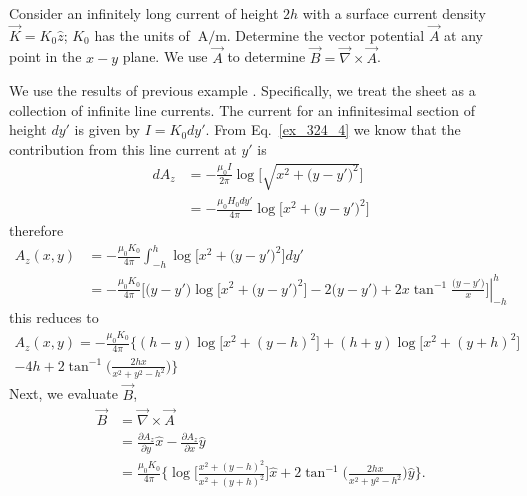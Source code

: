 \documentclass[12pt,a4paper,oneside]{book}
\begin{document}
\begin{onehalfspace}
\begin{example}
Consider an infinitely long current of height $2h$ with a surface current density $\vec{K}=K_0\hat{z}$; $K_0$ has the units of $\SI{}{\ampere\per\meter}$. Determine the vector potential $\vec{A}$ at any point in the $x-y$ plane. We use $\vec{A}$ to determine $\vec{B}=\vec{\nabla}\times\vec{A}$.

We use the results of previous example . Specifically, we treat the sheet as a collection  of infinite line currents. The current for an infinitesimal section of height $dy'$ is given by $I=K_0dy'$. From Eq.~\eqref{ex_324_4} we know that the contribution from this line current at $y'$ is
 \begin{equation}\label{ex_325_1}
	\begin{aligned}
		dA_z&=-\frac{\mu_0 I}{2\pi}\log\Big[\sqrt{x^2+\big(y-y'\big)^2}\Big] \\[6pt]
		&= -\frac{\mu_0 H_0 dy'}{4\pi}\log\Big[x^2+\big(y-y'\big)^2\Big]
	\end{aligned}
\end{equation}
therefore 
 \begin{equation}\label{ex_325_2}
	\begin{aligned}
		A_z(x,y)&=-\frac{\mu_0 K_0}{4\pi} \int_{-h}^{h}\log\Big[x^2+\big(y-y'\big)^2\Big]dy'\\[6pt]
		&= -\frac{\mu_0K_0}{4\pi}\left. \Big[\big(y-y'\big)\log\big[x^2+\big(y-y'\big)^2\big]-2\big(y-y'\big)+2x\tan^{-1}\frac{\big(y-y'\big)}{x}\Big]\right| _{-h}^h
	\end{aligned}
\end{equation}
this reduces to
 \begin{equation}\label{ex_325_3}
	\begin{aligned}
		A_z(x,y)=-\frac{\mu_0 K_0}{4\pi} \Biggl\{ (h-y)\log\big[x^2+(y-h)^2\big]+(h+y)\log\big[x^2+(y+h)^2\big] \\[6pt]
		 -4h+2\tan^{-1}\Big(\frac{2hx}{x^2+y^2-h^2}\Big)\Biggr\}
	\end{aligned}
\end{equation}
Next, we evaluate $\vec{B}$,
 \begin{equation}\label{ex_325_4}
	\begin{aligned}
		\vec{B}&=\vec{\nabla}\times\vec{A} \\[6pt]
		&=\frac{\partial A_z}{\partial y}\hat{x}-\frac{\partial A_z}{\partial x}\hat{y} \\[6pt]
		&= \frac{\mu_0 K_0}{4\pi}\Biggl\{\log\Big[\frac{x^2+(y-h)^2}{x^2+(y+h)^2}\Big]\hat{x}+2\tan^{-1}\Big(\frac{2hx}{x^2+y^2-h^2}\Big)\hat{y}\Biggr\}.
	\end{aligned}
\end{equation}
\end{example}




\end{onehalfspace}
\end{document}

